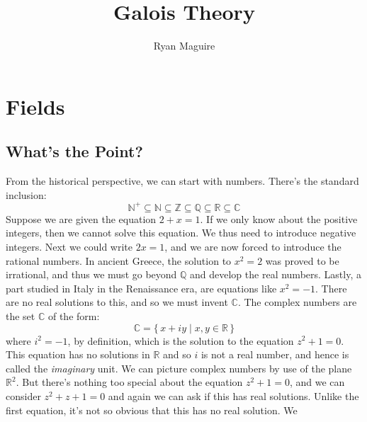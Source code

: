 \documentclass{article}                                                        %
\begin{document}
    \title{Galois Theory}
    \author{Ryan Maguire}
    \date{\vspace{-5ex}}
    \maketitle
    \section{Fields}
        \subsection{What's the Point?}
            From the historical perspective, we can start with numbers. There's
            the standard inclusion:
            \begin{equation}
                \mathbb{N}^{+}\subseteq\mathbb{N}\subseteq
                \mathbb{Z}\subseteq\mathbb{Q}\subseteq\mathbb{R}
                \subseteq\mathbb{C}
            \end{equation}
            Suppose we are given the equation $2+x=1$. If we only know about
            the positive integers, then we cannot solve this equation. We thus
            need to introduce negative integers. Next we could write $2x=1$,
            and we are now forced to introduce the rational numbers. In ancient
            Greece, the solution to $x^{2}=2$ was proved to be irrational, and
            thus we must go beyond $\mathbb{Q}$ and develop the real numbers.
            Lastly, a part studied in Italy in the Renaissance era, are
            equations like $x^{2}=\minus{1}$. There are no real solutions to
            this, and so we must invent $\mathbb{C}$. The complex numbers are
            the set $\mathbb{C}$ of the form:
            \begin{equation}
                \mathbb{C}=\{\,x+iy\;|\;x,y\in\mathbb{R}\,\}
            \end{equation}
            where $i^{2}=\minus{1}$, by definition, which is the solution to the
            equation $z^{2}+1=0$. This equation has no solutions in $\mathbb{R}$
            and so $i$ is not a real number, and hence is called the
            \textit{imaginary} unit. We can picture complex numbers by use of
            the plane $\mathbb{R}^{2}$. But there's nothing too special about
            the equation $z^{2}+1=0$, and we can consider $z^{2}+z+1=0$ and
            again we can ask if this has real solutions. Unlike the first
            equation, it's not so obvious that this has no real solution. We
\end{document}
